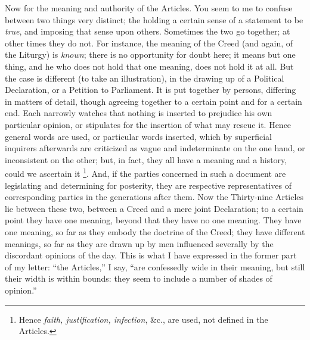 Now for the meaning and authority of the
Articles. You seem to me to confuse between two things very distinct;
the holding a certain sense of a statement to be \emph{true}, and
imposing that sense upon others. Sometimes the two go together; at
other times they do not. For instance, the meaning of the Creed (and
again, of the Liturgy) is \emph{known}; there is no opportunity for doubt
here; it means but one thing, and he who does not hold that one
meaning, does not hold it at all. But the case is different (to take
an illustration), in the drawing up of a Political Declaration, or a
Petition to Parliament. It is put together by persons, differing in
matters of detail, though agreeing together to a certain point
and for a certain end. Each narrowly watches that nothing is inserted
to prejudice his own particular opinion, or stipulates for the
insertion of what may rescue it. Hence general words are used, or
particular words inserted, which by superficial inquirers afterwards
are criticized as vague and indeterminate on the one hand, or
inconsistent on the other; but, in fact, they all have a meaning and a
history, could we ascertain it \footnote{Hence \emph{faith, justification, infection}, \&c., are used, not
defined in the Articles.}.
And, if the parties concerned in such a document are legislating and
determining for posterity, they are respective representatives of
corresponding parties in the generations after them. Now the
Thirty-nine Articles lie between these two, between a Creed and a mere
joint Declaration; to a certain point they have one meaning, beyond
that they have no one meaning. They have one meaning, so far as they
embody the doctrine of the Creed; they have different meanings, so far
as they are drawn up by men influenced severally by the discordant
opinions of the day. This is what I have expressed in the former part
of my letter: ``the Articles,'' I say, ``are confessedly wide in their
meaning, but still their width is within bounds: they seem to include
a number of shades of opinion.''

